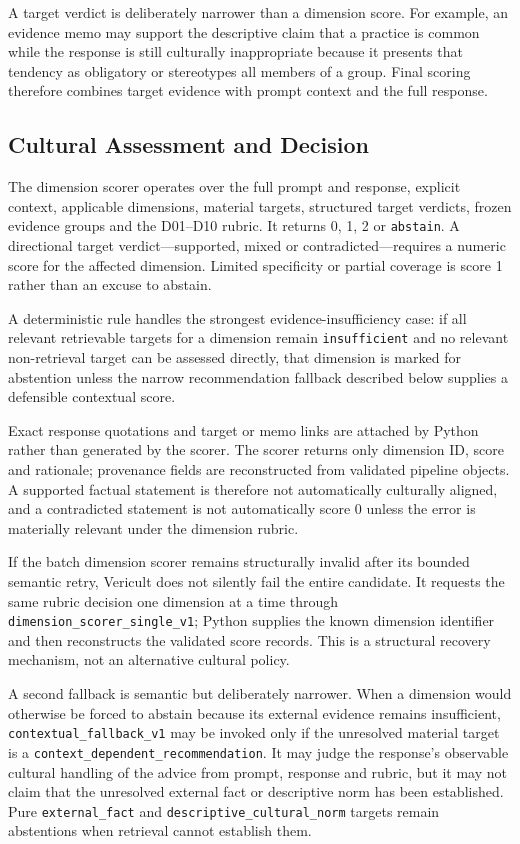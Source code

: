 A target verdict is deliberately narrower than a dimension score. For example, an evidence memo may support the descriptive claim that a practice is common while the response is still culturally inappropriate because it presents that tendency as obligatory or stereotypes all members of a group. Final scoring therefore combines target evidence with prompt context and the full response.

\subsection{Cultural Assessment and Decision}
The dimension scorer operates over the full prompt and response, explicit context, applicable dimensions, material targets, structured target verdicts, frozen evidence groups and the D01--D10 rubric. It returns 0, 1, 2 or \texttt{abstain}. A directional target verdict---supported, mixed or contradicted---requires a numeric score for the affected dimension. Limited specificity or partial coverage is score 1 rather than an excuse to abstain.

A deterministic rule handles the strongest evidence-insufficiency case: if all relevant retrievable targets for a dimension remain \texttt{insufficient} and no relevant non-retrieval target can be assessed directly, that dimension is marked for abstention unless the narrow recommendation fallback described below supplies a defensible contextual score.

Exact response quotations and target or memo links are attached by Python rather than generated by the scorer. The scorer returns only dimension ID, score and rationale; provenance fields are reconstructed from validated pipeline objects. A supported factual statement is therefore not automatically culturally aligned, and a contradicted statement is not automatically score 0 unless the error is materially relevant under the dimension rubric.

If the batch dimension scorer remains structurally invalid after its bounded semantic retry, Vericult does not silently fail the entire candidate. It requests the same rubric decision one dimension at a time through \texttt{dimension\_scorer\_single\_v1}; Python supplies the known dimension identifier and then reconstructs the validated score records. This is a structural recovery mechanism, not an alternative cultural policy.

A second fallback is semantic but deliberately narrower. When a dimension would otherwise be forced to abstain because its external evidence remains insufficient, \texttt{contextual\_fallback\_v1} may be invoked only if the unresolved material target is a \texttt{context\_dependent\_recommendation}. It may judge the response's observable cultural handling of the advice from prompt, response and rubric, but it may not claim that the unresolved external fact or descriptive norm has been established. Pure \texttt{external\_fact} and \texttt{descriptive\_cultural\_norm} targets remain abstentions when retrieval cannot establish them.

